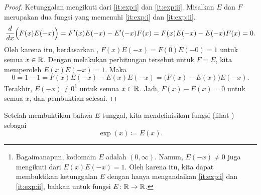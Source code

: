 \begin{proof}
Ketunggalan mengikuti dari
\ref{it:exp:i} dan
\ref{it:exp:ii}.
Misalkan $E$ dan $F$
merupakan dua fungsi yang memenuhi
\ref{it:exp:i} dan \ref{it:exp:ii}.
\begin{equation*}
\frac{d}{dx} \Bigl( F(x)E(-x) \Bigr)
=
F'(x)E(-x) - E'(-x)F(x)
=
F(x)E(-x) - E(-x)F(x) = 0 .
\end{equation*}
Oleh karena itu, berdasarkan ,
$F(x)E(-x) = F(0)E(-0) = 1$ untuk semua $x \in {\mathbb{R}}$.
Dengan melakukan perhitungan tersebut untuk $F = E$,
kita memperoleh $E(x)E(-x) = 1$.
Maka
\begin{equation*}
0 = 1-1 = F(x)E(-x) - E(x)E(-x) = \bigl(F(x)-E(x)\bigr) E(-x) .
\end{equation*}
Terakhir, $E(-x) \neq 0$\footnote{%
Bagaimanapun, kodomain $E$ adalah $(0,\infty)$.
Namun, $E(-x) \neq 0$ juga mengikuti
dari $E(x)E(-x) = 1$.  Oleh karena itu, kita dapat membuktikan ketunggalan $E$
dengan hanya mengandaikan \ref{it:exp:i} dan \ref{it:exp:ii}, bahkan untuk fungsi $E \colon {\mathbb{R}}
\to {\mathbb{R}}$.}
untuk semua $x \in {\mathbb{R}}$.
Jadi,
$F(x)-E(x) = 0$ untuk semua $x$, dan pembuktian selesai.
\end{proof}

Setelah membuktikan bahwa $E$ tunggal, kita mendefinisikan fungsi
\emph{} (lihat ) sebagai
\begin{equation*}
\exp(x) \coloneqq E(x) .
\end{equation*}
\begin{myfigureht}
\caption{Grafik $e^x$, bersama medan kemiringan dengan kemiringan $y$ di
setiap titik $(x,y)$.
Persamaan $\frac{d}{dx} e^x = e^x$ berarti bahwa $y=e^x$ mengikuti kemiringan-kemiringan tersebut.\label{fig:exp}}
\end{myfigureht}

